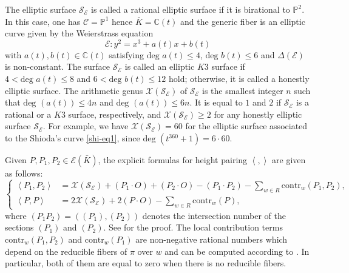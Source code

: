 \documentclass[11pt]{amsart}
\newcommand{\Kb}{{{\bar K}}}
\newcommand{\Pp}{{\mathbb P}}
\newcommand{\CC}{{\mathbb C}}
\newcommand{\Cc}{{\mathcal C}}
\newcommand{\Ee}{{\mathcal E}}
\newcommand{\Sc}{{\mathcal S}}
\newcommand{\Xc}{{\mathcal X}}
\numberwithin{equation}{section}
\numberwithin{table}{section}
\newcommand\<{\langle}
\def\deg{\mbox{deg }}
\begin{document}
The elliptic surface $\Sc_\Ee$ 
is called a {\sf rational elliptic surface} if  it is birational to $\Pp^2$.
In this case, one has $\Cc=\Pp^1$ hence $\Kb=\CC(t)$  and the generic fiber  
is an elliptic curve  given by the Weierstrass equation  
\begin{equation}
	\label{ell1}
	\Ee: y^2=x^3+ a(t) x + b(t)
\end{equation}
with  $a(t), b(t)\in \CC(t)$ satisfying
$\deg a(t)\leq 4$,  $\deg b(t)\leq 6$ and  $\Delta(\Ee)$ is non-constant.
The  surface $\Sc_\Ee$ is  called an {\sf elliptic  $K3$ surface} if   $4<\deg a(t)\leq 8$ and  $6< \deg b(t)\leq 12$ hold;
otherwise, it is called a {\sf honestly elliptic  surface}.
The {\sf arithmetic genus}  $\Xc (\Sc_\Ee)$ of $\Sc_\Ee$ is the smallest integer $n$ such that $\deg(a(t))\leq 4 n$ and $\deg(a(t))\leq 6 n$.
It is  equal to $1$ and $2$ if $\Sc_\Ee$ is a rational or a $K3$ surface, respectively,
and   $\Xc (\Sc_\Ee) \geq 2$ for  any  honestly elliptic surface $\Sc_\Ee$.
For example, we have $\Xc (\Sc_\Ee) =60$ for the elliptic surface associated to the Shioda's curve \eqref{shi-eq1}, since
$\deg( t^{360}+1)= 6\cdot 60$.


Given $P, P_1, P_2 \in \Ee(\Kb)$, the explicit formulas for height pairing $\left\langle ,  \right\rangle$ are given  as follows:
\begin{equation}
	\label{hf1}
	\begin{cases}
		\left\langle P_1, P_2\right\rangle &\displaystyle =\Xc (\Sc_\Ee)+ (P_1\cdot O)+(P_2\cdot O)- (P_1 \cdot P_2) - \sum_{w \in R}^{} \text{contr}_{w}(P_1, P_2),\\
		\left\langle P, P\right\rangle &\displaystyle =2 \Xc (\Sc_\Ee)+ 2 (P \cdot O) - \sum_{w \in R}^{} \text{contr}_{w}(P), 
	\end{cases}
\end{equation}
where  $(P_1 P_2)=((P_1), (P_2))$ denotes the intersection
number of the sections $(P_1)$ and $(P_2).$  See  \cite[Theorem 8.6]{Shioda1990a}  for the proof.
The {\sf local contribution terms} $\text{contr}_{w}(P_1, P_2)$ and 
$ \text{contr}_{w}(P_1)$ are non-negative rational numbers which  depend on the reducible fibers of $\pi$ over $w$
and  can be computed according to  \cite[Table 8.16]{Shioda1990a}.
In particular,   both of them are equal to zero when there is no reducible fibers.  
\end{document}
